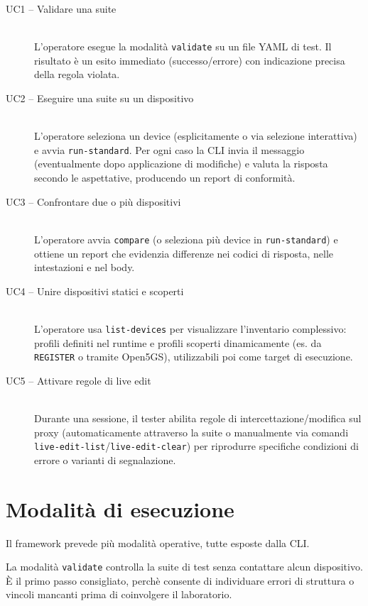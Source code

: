 \begin{description}
	\item[UC1 -- Validare una suite]\leavevmode\\
	L'operatore esegue la modalit\`a \texttt{validate} su un file YAML di test. Il risultato \`e un esito immediato (successo/errore) con indicazione precisa della regola violata.
	\item[UC2 -- Eseguire una suite su un dispositivo]\leavevmode\\
	L'operatore seleziona un device (esplicitamente o via selezione interattiva) e avvia \texttt{run-\allowbreak standard}. Per ogni caso la CLI invia il messaggio (eventualmente dopo applicazione di modifiche) e valuta la risposta secondo le aspettative, producendo un report di conformit\`a.
	\item[UC3 -- Confrontare due o pi\`u dispositivi]\leavevmode\\
	L'operatore avvia \texttt{compare} (o seleziona pi\`u device in \texttt{run-\allowbreak standard}) e ottiene un report che evidenzia differenze nei codici di risposta, nelle intestazioni e nel body.
	\item[UC4 -- Unire dispositivi statici e scoperti]\leavevmode\\
	L'operatore usa \texttt{list-\allowbreak devices} per visualizzare l'inventario complessivo: profili definiti nel runtime e profili scoperti dinamicamente (es. da \texttt{REGISTER} o tramite Open5GS), utilizzabili poi come target di esecuzione.
	\item[UC5 -- Attivare regole di live edit]\leavevmode\\
	Durante una sessione, il tester abilita regole di intercettazione/modifica sul proxy (automaticamente attraverso la suite o manualmente via comandi \texttt{live-\allowbreak edit-\allowbreak list}/\texttt{live-\allowbreak edit-\allowbreak clear}) per riprodurre specifiche condizioni di errore o varianti di segnalazione.
\end{description}

\section{Modalit\`a di esecuzione}
Il framework prevede pi\`u modalit\`a operative, tutte esposte dalla CLI.

La modalit\`a \texttt{validate} controlla la suite di test senza contattare alcun dispositivo. \`E il primo passo consigliato, perch\`e consente di individuare errori di struttura o vincoli mancanti prima di coinvolgere il laboratorio.

